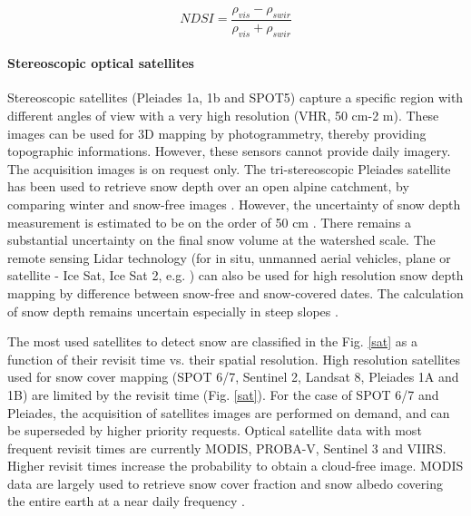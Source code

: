 \documentclass[hydrology,article,submit,moreauthors,pdftex]{Definitions/mdpi}
\begin{document}
 



\begin{equation}
NDSI=\dfrac{\rho_{vis}-\rho_{swir}}{\rho_{vis}+\rho_{swir}}
\label{ndsi}
\end{equation}

\paragraph{Stereoscopic optical satellites}

Stereoscopic satellites (Pleiades 1a, 1b and SPOT5) capture a specific region with different angles of view with a very high resolution (VHR, 50 cm-2 m). These images can be used for 3D mapping by photogrammetry, thereby providing topographic informations. However, these sensors cannot provide daily imagery. The acquisition images is on request only. The tri-stereoscopic Pleiades satellite has been used to retrieve snow depth over an open alpine catchment, by comparing winter and snow-free images \citep{Marti_2016}. However, the uncertainty of snow depth measurement is estimated to be on the order of 50 cm \citep{Marti_2016}. There remains a substantial uncertainty on the final snow volume at the watershed scale. The remote sensing Lidar technology (for in situ, unmanned aerial vehicles, plane or satellite - Ice Sat, Ice Sat 2, e.g. \citep{kwok2008, deems2013}) can also be used for high resolution snow depth mapping by difference between snow-free and snow-covered dates. The calculation of snow depth remains uncertain especially in steep slopes \citep{Deems_2006}.


The most used satellites to detect snow are classified in the Fig. \ref{sat} as a function of their revisit time vs. their spatial resolution.  High resolution satellites used for snow cover mapping (SPOT 6/7, Sentinel 2, Landsat 8, Pleiades 1A and 1B) are limited by the revisit time (Fig. \ref{sat}). For the case of SPOT 6/7 and Pleiades, the acquisition of satellites images are performed on demand, and can be superseded by higher priority requests. Optical satellite data with most frequent revisit times are currently MODIS, PROBA-V, Sentinel 3 and VIIRS. Higher revisit times increase the probability to obtain a cloud-free image. 
MODIS data are largely used to retrieve snow cover fraction and snow albedo covering the entire earth at a near daily frequency \citep{Klein_2002,Masson_2018}. 
\end{document}
